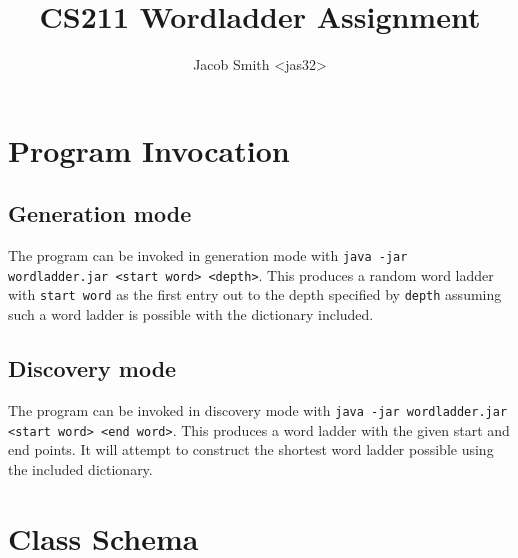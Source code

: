 \documentclass[11pt]{article} %
\title{CS211 Wordladder Assignment}
\author{Jacob Smith <jas32>}
\begin{document}
\maketitle

\section{Program Invocation}

\subsection{Generation mode}
The program can be invoked in generation mode with \texttt{java -jar wordladder.jar <start word> <depth>}. This produces a random word ladder with \texttt{start word} as the first entry out to the depth specified by \texttt{depth} assuming such a word ladder is possible with the dictionary included.

\subsection{Discovery mode}
The program can be invoked in discovery mode with \texttt{java -jar wordladder.jar <start word> <end word>}. This produces a word ladder with the given start and end points. It will attempt to construct the shortest word ladder possible using the included dictionary.

\section{Class Schema}
\end{document}
